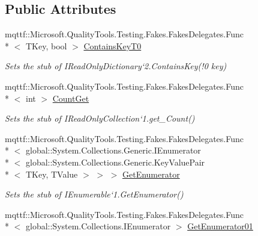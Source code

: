 \subsection*{Public Attributes}
\begin{DoxyCompactItemize}
\item 
mqttf\-::\-Microsoft.\-Quality\-Tools.\-Testing.\-Fakes.\-Fakes\-Delegates.\-Func\\*
$<$ T\-Key, bool $>$ \hyperlink{class_system_1_1_collections_1_1_generic_1_1_fakes_1_1_stub_i_read_only_dictionary_3_01_t_key_00_01_t_value_01_4_a3d98eb2bbd985fd30cef12afe4d91a69}{Contains\-Key\-T0}
\begin{DoxyCompactList}\small\item\em Sets the stub of I\-Read\-Only\-Dictionary`2.Contains\-Key(!0 key)\end{DoxyCompactList}\item 
mqttf\-::\-Microsoft.\-Quality\-Tools.\-Testing.\-Fakes.\-Fakes\-Delegates.\-Func\\*
$<$ int $>$ \hyperlink{class_system_1_1_collections_1_1_generic_1_1_fakes_1_1_stub_i_read_only_dictionary_3_01_t_key_00_01_t_value_01_4_a24560115984fe1e07c4f67312b62cdb5}{Count\-Get}
\begin{DoxyCompactList}\small\item\em Sets the stub of I\-Read\-Only\-Collection`1.get\-\_\-\-Count()\end{DoxyCompactList}\item 
mqttf\-::\-Microsoft.\-Quality\-Tools.\-Testing.\-Fakes.\-Fakes\-Delegates.\-Func\\*
$<$ global\-::\-System.\-Collections.\-Generic.\-I\-Enumerator\\*
$<$ global\-::\-System.\-Collections.\-Generic.\-Key\-Value\-Pair\\*
$<$ T\-Key, T\-Value $>$ $>$ $>$ \hyperlink{class_system_1_1_collections_1_1_generic_1_1_fakes_1_1_stub_i_read_only_dictionary_3_01_t_key_00_01_t_value_01_4_af075c9634ba9b2f6cd00096e9493da84}{Get\-Enumerator}
\begin{DoxyCompactList}\small\item\em Sets the stub of I\-Enumerable`1.Get\-Enumerator()\end{DoxyCompactList}\item 
mqttf\-::\-Microsoft.\-Quality\-Tools.\-Testing.\-Fakes.\-Fakes\-Delegates.\-Func\\*
$<$ global\-::\-System.\-Collections.\-I\-Enumerator $>$ \hyperlink{class_system_1_1_collections_1_1_generic_1_1_fakes_1_1_stub_i_read_only_dictionary_3_01_t_key_00_01_t_value_01_4_a5faa3910c945adbd7eb414a68827b65d}{Get\-Enumerator01}

\end{DoxyCompactItemize}
